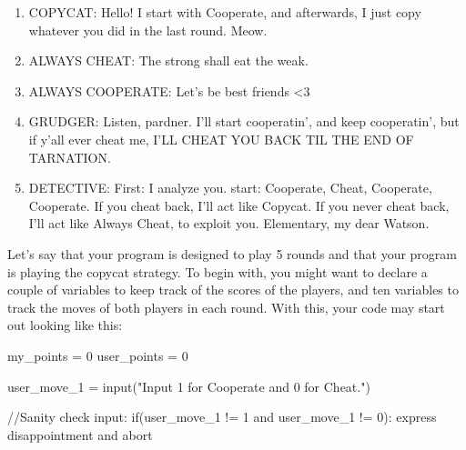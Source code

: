 \documentclass[
  letterpaper,
  DIV=11,
  numbers=noendperiod]{scrreprt}
\newenvironment{Shaded}{\begin{snugshade}}{\end{snugshade}}
\newcommand{\CommentTok}[1]{\textcolor[rgb]{0.37,0.37,0.37}{#1}}
\newcommand{\ControlFlowTok}[1]{\textcolor[rgb]{0.00,0.23,0.31}{#1}}
\newcommand{\DecValTok}[1]{\textcolor[rgb]{0.68,0.00,0.00}{#1}}
\newcommand{\FunctionTok}[1]{\textcolor[rgb]{0.28,0.35,0.67}{#1}}
\newcommand{\NormalTok}[1]{\textcolor[rgb]{0.00,0.23,0.31}{#1}}
\newcommand{\OperatorTok}[1]{\textcolor[rgb]{0.37,0.37,0.37}{#1}}
\newcommand{\StringTok}[1]{\textcolor[rgb]{0.13,0.47,0.30}{#1}}
\providecommand{\tightlist}{%
  \setlength{\itemsep}{0pt}\setlength{\parskip}{0pt}}\usepackage{longtable,booktabs,array}
\begin{document}
\begin{tcolorbox}[standard jigsaw,titlerule=0mm, leftrule=.75mm, colbacktitle=quarto-callout-note-color!10!white, toptitle=1mm, toprule=.15mm, colframe=quarto-callout-note-color-frame, colback=white, coltitle=black, title=\textcolor{quarto-callout-note-color}{\faInfo}\hspace{0.5em}{Player Strategies}, bottomrule=.15mm, rightrule=.15mm, bottomtitle=1mm, left=2mm, opacitybacktitle=0.6, arc=.35mm, opacityback=0]

\begin{enumerate}
\def\labelenumi{\arabic{enumi}.}
\tightlist
\item
  COPYCAT: Hello! I start with Cooperate, and afterwards, I just copy
  whatever you did in the last round. Meow.
\item
  ALWAYS CHEAT: The strong shall eat the weak.
\item
  ALWAYS COOPERATE: Let's be best friends \textless3
\item
  GRUDGER: Listen, pardner. I'll start cooperatin', and keep
  cooperatin', but if y'all ever cheat me, I'LL CHEAT YOU BACK TIL THE
  END OF TARNATION.
\item
  DETECTIVE: First: I analyze you. start: Cooperate, Cheat, Cooperate,
  Cooperate. If you cheat back, I'll act like Copycat. If you never
  cheat back, I'll act like Always Cheat, to exploit you. Elementary, my
  dear Watson.
\end{enumerate}

\end{tcolorbox}

Let's say that your program is designed to play 5 rounds and that your
program is playing the copycat strategy. To begin with, you might want
to declare a couple of variables to keep track of the scores of the
players, and ten variables to track the moves of both players in each
round. With this, your code may start out looking like this:

\begin{Shaded}
\begin{Highlighting}[]
\NormalTok{my\_points }\OperatorTok{=} \DecValTok{0}
\NormalTok{user\_points }\OperatorTok{=} \DecValTok{0}

\NormalTok{user\_move\_1 }\OperatorTok{=} \FunctionTok{input}\OperatorTok{(}\StringTok{"Input 1 for Cooperate and 0 for Cheat."}\OperatorTok{)}

\CommentTok{//Sanity check input:}
\ControlFlowTok{if}\OperatorTok{(}\NormalTok{user\_move\_1 }\OperatorTok{!=} \DecValTok{1}\NormalTok{ and user\_move\_1 }\OperatorTok{!=} \DecValTok{0}\OperatorTok{):}
\NormalTok{    express disappointment and abort}
\end{Highlighting}
\end{Shaded}
\end{document}
